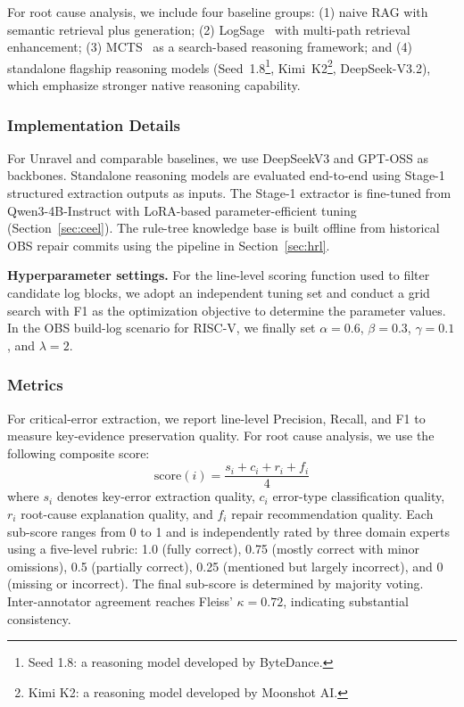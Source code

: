 \documentclass[sigconf]{acmart}
\begin{document}
For root cause analysis, we include four baseline groups: (1) naive RAG with semantic retrieval plus generation; (2) LogSage~\cite{xu2025logsage} with multi-path retrieval enhancement; (3) MCTS~\cite{shuai2025root} as a search-based reasoning framework; and (4) standalone flagship reasoning models (Seed~1.8\footnote{Seed 1.8: a reasoning model developed by ByteDance.}, Kimi~K2\footnote{Kimi K2: a reasoning model developed by Moonshot AI.}, DeepSeek-V3.2), which emphasize stronger native reasoning capability.

\subsubsection{Implementation Details}
For Unravel and comparable baselines, we use DeepSeekV3 and GPT-OSS as backbones. Standalone reasoning models are evaluated end-to-end using Stage-1 structured extraction outputs as inputs. The Stage-1 extractor is fine-tuned from Qwen3-4B-Instruct with LoRA-based parameter-efficient tuning (Section~\ref{sec:ceel}). The rule-tree knowledge base is built offline from historical OBS repair commits using the pipeline in Section~\ref{sec:hrl}.

\textbf{Hyperparameter settings.} For the line-level scoring function used to filter candidate log blocks, we adopt an independent tuning set and conduct a grid search with F1 as the optimization objective to determine the parameter values. In the OBS build-log scenario for RISC-V, we finally set $\alpha=0.6$, $\beta=0.3$, $\gamma=0.1$, and $\lambda=2$.

\subsubsection{Metrics}
\begin{sloppypar}
For critical-error extraction, we report line-level Precision, Recall, and F1 to measure key-evidence preservation quality. For root cause analysis, we use the following composite score:
\begin{equation}
\text{score}(i) = \frac{s_i + c_i + r_i + f_i}{4}
\end{equation}
where $s_i$ denotes key-error extraction quality, $c_i$ error-type classification quality, $r_i$ root-cause explanation quality, and $f_i$ repair recommendation quality. Each sub-score ranges from 0 to 1 and is independently rated by three domain experts using a five-level rubric: 1.0 (fully correct), 0.75 (mostly correct with minor omissions), 0.5 (partially correct), 0.25 (mentioned but largely incorrect), and 0 (missing or incorrect). The final sub-score is determined by majority voting. Inter-annotator agreement reaches Fleiss' $\kappa=0.72$, indicating substantial consistency.
\end{sloppypar}
\end{document}
